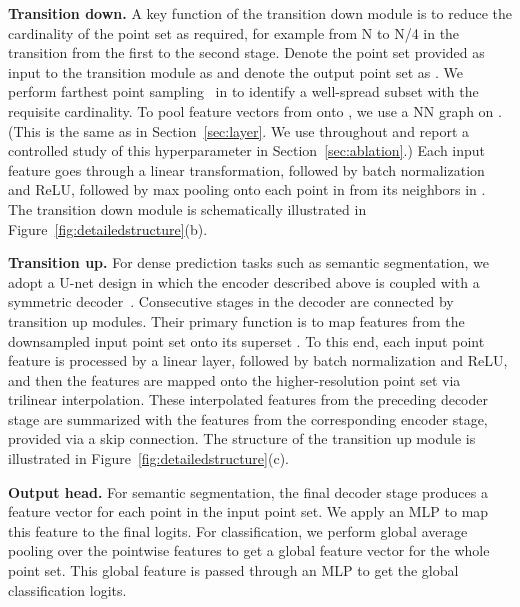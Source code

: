 \documentclass[final]{cvpr}
\newcommand\mypara[1]{\vspace{1mm}\noindent\textbf{#1}}
\begin{document}
\mypara{Transition down.}
A key function of the transition down module is to reduce the cardinality of the point set as required, for example from N to N/4 in the transition from the first to the second stage. Denote the point set provided as input to the transition module as  and denote the output point set as .
We perform farthest point sampling~\cite{qi2017pointnet2} in  to identify a well-spread subset  with the requisite cardinality. To pool feature vectors from  onto , we use a NN graph on . (This is the same  as in Section~\ref{sec:layer}. We use  throughout and report a controlled study of this hyperparameter in Section~\ref{sec:ablation}.) Each input feature goes through a linear transformation, followed by batch normalization and ReLU, followed by max pooling onto each point in  from its  neighbors in .
The transition down module is schematically illustrated in Figure~\ref{fig:detailedstructure}(b).

\mypara{Transition up.}
For dense prediction tasks such as semantic segmentation, we adopt a U-net design in which the encoder described above is coupled with a symmetric decoder~\cite{qi2017pointnet2,choy20194d}. Consecutive stages in the decoder are connected by transition up modules. Their primary function is to map features from the downsampled input point set  onto its superset .
To this end, each input point feature is processed by a linear layer, followed by batch normalization and ReLU, and then the features are mapped onto the higher-resolution point set  via trilinear interpolation.
These interpolated features from the preceding decoder stage are summarized with the features from the corresponding encoder stage, provided via a skip connection.
The structure of the transition up module is illustrated in Figure~\ref{fig:detailedstructure}(c).

\mypara{Output head.}
For semantic segmentation, the final decoder stage produces a feature vector for each point in the input point set. We apply an MLP to map this feature to the final logits. For classification, we perform global average pooling over the pointwise features to get a global feature vector for the whole point set. This global feature is passed through an MLP to get the global classification logits.
 
\end{document}
